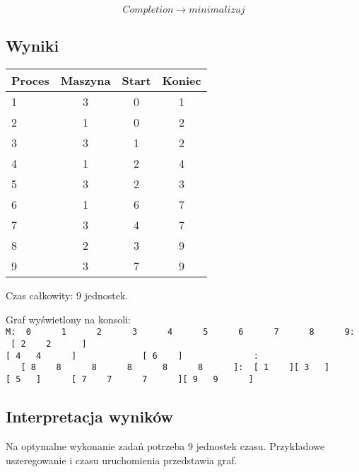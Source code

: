 \documentclass[polish,12pt,titlepage]{article}
\begin{document}
$$Completion \rightarrow minimalizuj$$

\subsection{Wyniki}

\begin{center}
\begin{tabular}{ | l | c | c | c | }
	\hline
	Proces & Maszyna & Start & Koniec \\
	\hline
	1 & 3 & 0 & 1 \\
	2 & 1 & 0 & 2 \\
	3 & 3 & 1 & 2 \\
	4 & 1 & 2 & 4 \\
	5 & 3 & 2 & 3 \\
	6 & 1 & 6 & 7 \\
	7 & 3 & 4 & 7 \\ 
	8 & 2 & 3 & 9 \\
	9 & 3 & 7 & 9 \\
	\hline
\end{tabular}
\end{center}

\begin{center}
Czas całkowity: $9$ jednostek.
\end{center}

\begin{center}
Graf wyświetlony na konsoli:\linebreak
\texttt{
M:~~0~~~~~~1~~~~~~2~~~~~~3~~~~~~4~~~~~~5~~~~~~6~~~~~~7~~~~~~8~~~~~~9:~~[~2~~~~2~~~~~~][~4~~~4~~~~~~]~~~~~~~~~~~~~[~6~~~~]~~~~~~~~~~~~~~:~~~~~~~~~~~~~~~~~~~~~~~[~8~~~~8~~~~~~8~~~~~~8~~~~~~8~~~~~~8~~~~~~]:~~[~1~~~~][~3~~~][~5~~~]~~~~~~[~7~~~~7~~~~~~7~~~~~~][~9~~~9~~~~~~]
}
\end{center}

\subsection{Interpretacja wyników}

Na optymalne wykonanie zadań potrzeba 9 jednostek czasu. Przykładowe uszeregowanie i czasu uruchomienia przedstawia graf.
\end{document}

